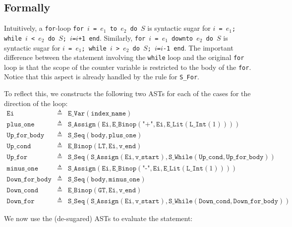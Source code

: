 \documentclass{book}
\newcommand\evalarrow[0]{\rightsquigarrow}
\newcommand\evalstmt[1]{\texttt{eval\_stmt}(#1)}
\newcommand\evalfor[1]{\texttt{eval\_for}(#1)}
\newcommand\env[0]{\texttt{env}}
\newcommand\vstart[0]{\texttt{v\_start}}
\newcommand\vend[0]{\texttt{v\_end}}
\newcommand\body[0]{\texttt{body}}
\newcommand\vindexname[0]{\texttt{index\_name}}
\begin{document}
\begin{emptyformal}
    \subsection{Formally}
    Intuitively, a \texttt{for}-loop \texttt{for $i$ = $e_1$ to $e_2$ do $S$} is syntactic sugar for
    \texttt{$i$ = $e_1$; while $i$ < $e_2$ do $S$; $i$=$i$+1 end}.
    Similarly, \texttt{for $i$ = $e_1$ downto $e_2$ do $S$} is syntactic sugar for
    \texttt{$i$ = $e_1$; while $i$ > $e_2$ do $S$; $i$=$i$-1 end}. The important difference between
    the statement involving the \texttt{while} loop and the original \texttt{for} loop is that the
    scope of the counter variable is restricted to the body of the \texttt{for}. Notice that this
    aspect is already handled by the rule for \texttt{S\_For}.

    To reflect this, we constructs the following two ASTs for each of the cases for the direction of the loop:
\[
\begin{array}{rcl}
  \texttt{Ei}         &\triangleq& \texttt{E\_Var}(\vindexname)\\
  \texttt{plus\_one}   &\triangleq& \texttt{S\_Assign}(\texttt{Ei}, \texttt{E\_Binop}(\texttt{"+"}, \texttt{Ei}, \texttt{E\_Lit}(\texttt{L\_Int}(1))))\\
  \texttt{Up\_for\_body}  &\triangleq& \texttt{S\_Seq}(\body, \texttt{plus\_one})\\
  \texttt{Up\_cond}       &\triangleq& \texttt{E\_Binop}(\texttt{LT}, \texttt{Ei}, \vend)\\
  \texttt{Up\_for}       &\triangleq& \texttt{S\_Seq}(\texttt{S\_Assign}(\texttt{Ei}, \vstart), \texttt{S\_While}(\texttt{Up\_cond}, \texttt{Up\_for\_body}))\\
  \hline
  \texttt{minus\_one}   &\triangleq& \texttt{S\_Assign}(\texttt{Ei}, \texttt{E\_Binop}(\texttt{"-"}, \texttt{Ei}, \texttt{E\_Lit}(\texttt{L\_Int}(1))))\\
  \texttt{Down\_for\_body}  &\triangleq& \texttt{S\_Seq}(\body, \texttt{minus\_one})\\
  \texttt{Down\_cond}       &\triangleq& \texttt{E\_Binop}(\texttt{GT}, \texttt{Ei}, \vend)\\
  \texttt{Down\_for}       &\triangleq& \texttt{S\_Seq}(\texttt{S\_Assign}(\texttt{Ei}, \vstart), \texttt{S\_While}(\texttt{Down\_cond}, \texttt{Down\_for\_body}))
\end{array}
\]

  We now use the (de-sugared) ASTs to evaluate the statement:


\end{emptyformal}
\end{document}
